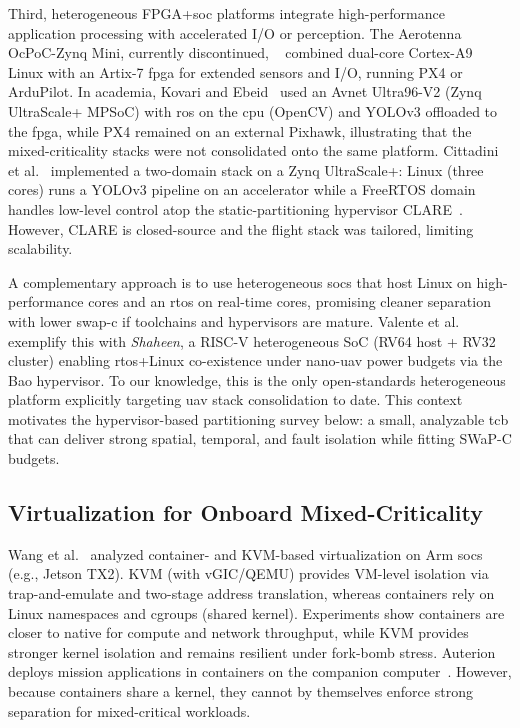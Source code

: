 Third, heterogeneous FPGA+\gls{soc} platforms integrate high-performance
application processing with accelerated I/O or perception. The Aerotenna
OcPoC-Zynq Mini, currently discontinued, ~\cite{ocpoc,ocpoc-discontinued} combined dual-core Cortex-A9
Linux with an Artix-7 \gls{fpga} for extended sensors and I/O, running PX4 or
ArduPilot. In academia, Kovari and Ebeid~\cite{kovari_mpdrone_2021} used an
Avnet Ultra96-V2 (Zynq UltraScale+ MPSoC) with \gls{ros} on the \gls{cpu} (OpenCV) and
YOLOv3 offloaded to the \gls{fpga}, while PX4 remained on an external
Pixhawk, illustrating that the mixed-criticality stacks were not consolidated
onto the same platform. Cittadini et al.~\cite{cittadini_supporting_2023}
implemented a two-domain stack on a Zynq UltraScale+: Linux (three cores) runs a
YOLOv3 pipeline on an accelerator while a FreeRTOS domain handles low-level
control atop the static-partitioning hypervisor CLARE~\cite{clare-home}.
However, CLARE is closed-source and the flight stack was tailored, limiting
scalability.

A complementary approach is to use heterogeneous \glspl{soc} that host Linux on
high-performance cores and an \gls{rtos} on real-time cores, promising cleaner
separation with lower \gls{swap-c} if toolchains and hypervisors are
mature. Valente et al.~\cite{valente_heterogeneous_2024} exemplify this with
\emph{Shaheen}, a RISC-V heterogeneous SoC (RV64 host + RV32 cluster) enabling
\gls{rtos}+Linux co-existence under nano-\gls{uav} power budgets via the Bao hypervisor. %
To our knowledge, this is the only open-standards heterogeneous platform explicitly
targeting \gls{uav} stack consolidation to date.
%
This context motivates the hypervisor-based partitioning survey below: a small,
analyzable \gls{tcb} that can deliver strong spatial, temporal, and fault
isolation while fitting SWaP-C budgets.

\subsection{Virtualization for Onboard Mixed-Criticality}
\label{subsec:rw-virt}
Wang et al.~\cite{wang_enabling_2018} analyzed container- and KVM-based
virtualization on Arm \glspl{soc} (e.g., Jetson TX2). KVM (with vGIC/QEMU) provides VM-level isolation via
trap-and-emulate and two-stage address translation, whereas containers rely on
Linux namespaces and cgroups (shared kernel).
Experiments show containers are closer to native for compute and
network throughput, while KVM provides stronger kernel isolation and remains
resilient under fork-bomb stress. %
Auterion deploys mission applications in containers on the companion computer~\cite{auterion-sw-services}.
However, because containers share a kernel, they cannot by themselves enforce strong separation for mixed-critical workloads.

